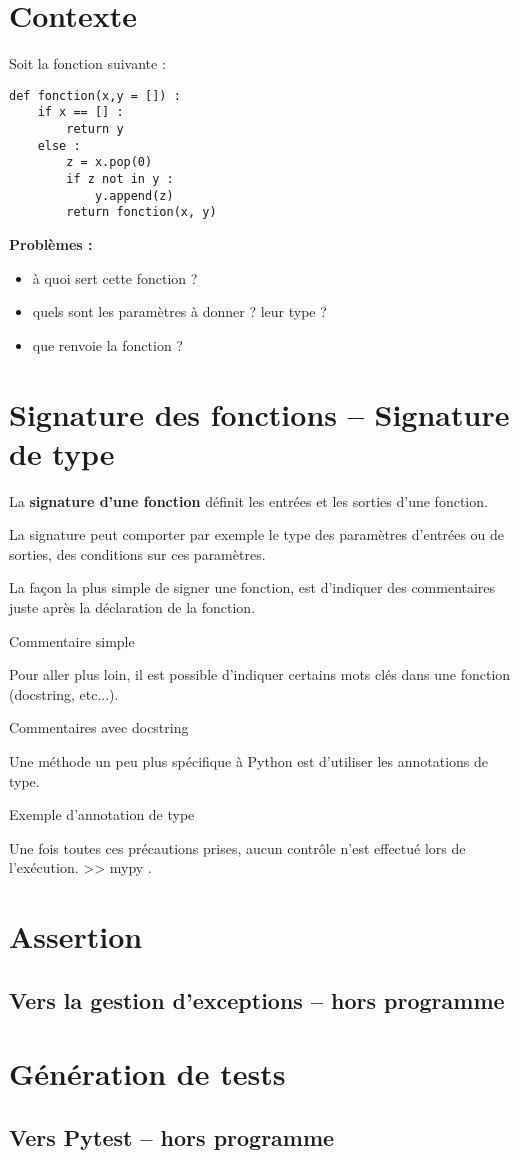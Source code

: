 \section{Contexte}
Soit la fonction suivante : 
\begin{lstlisting}
def fonction(x,y = []) :
    if x == [] : 
        return y
    else : 
        z = x.pop(0)
        if z not in y : 
            y.append(z)
        return fonction(x, y)
\end{lstlisting}

\textbf{Problèmes :}
\begin{itemize}
\item à quoi sert cette fonction ?
\item quels sont les paramètres à donner ? leur type ?
\item que renvoie la fonction ?
\end{itemize}


\section{Signature des fonctions -- Signature de type}
\begin{defi}
La \textbf{signature d'une fonction} définit les entrées et les sorties d'une fonction. 
\end{defi}


La signature peut comporter par exemple le type  des paramètres d'entrées ou de sorties, des conditions sur ces paramètres. 

La façon la plus simple de signer une fonction, est d'indiquer des commentaires juste après la déclaration de la fonction. 

\begin{exemple}
Commentaire simple
\end{exemple}


Pour aller plus loin, il est possible d'indiquer certains mots clés dans une fonction (docstring, etc...).

\begin{exemple}
Commentaires avec docstring
\end{exemple}

Une méthode un peu plus spécifique à Python est d'utiliser les annotations de type. 

\begin{exemple}
Exemple d'annotation de type
\end{exemple}


Une fois toutes ces précautions prises, aucun contrôle n'est effectué lors de l'exécution. >> mypy .

\section{Assertion}

\subsection{Vers la gestion d'exceptions -- hors programme}


\section{Génération de tests}


\subsection{Vers Pytest -- hors programme}


